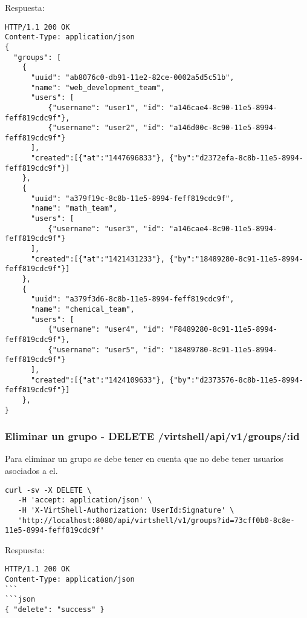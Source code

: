 \vspace{1cm}
Respuesta:
\vspace{1cm}

\begin{lstlisting}[style=json]
HTTP/1.1 200 OK
Content-Type: application/json
{
  "groups": [
    {
      "uuid": "ab8076c0-db91-11e2-82ce-0002a5d5c51b",
      "name": "web_development_team",
      "users": [ 
          {"username": "user1", "id": "a146cae4-8c90-11e5-8994-feff819cdc9f"},
          {"username": "user2", "id": "a146d00c-8c90-11e5-8994-feff819cdc9f"}
      ],     
      "created":[{"at":"1447696833"}, {"by":"d2372efa-8c8b-11e5-8994-feff819cdc9f"}]
    },
    {
      "uuid": "a379f19c-8c8b-11e5-8994-feff819cdc9f",
      "name": "math_team",
      "users": [ 
          {"username": "user3", "id": "a146cae4-8c90-11e5-8994-feff819cdc9f"}
      ],     
      "created":[{"at":"1421431233"}, {"by":"18489280-8c91-11e5-8994-feff819cdc9f"}]
    },
    {
      "uuid": "a379f3d6-8c8b-11e5-8994-feff819cdc9f",
      "name": "chemical_team",
      "users": [ 
          {"username": "user4", "id": "F8489280-8c91-11e5-8994-feff819cdc9f"},
          {"username": "user5", "id": "18489780-8c91-11e5-8994-feff819cdc9f"}
      ],       
      "created":[{"at":"1424109633"}, {"by":"d2373576-8c8b-11e5-8994-feff819cdc9f"}]
    },        
}  
\end{lstlisting}

\subsubsection{Eliminar un grupo - DELETE /virtshell/api/v1/groups/:id}

Para eliminar un grupo se debe tener en cuenta que no debe tener usuarios asociados a el.

\begin{lstlisting}[style=json]
curl -sv -X DELETE \
   -H 'accept: application/json' \
   -H 'X-VirtShell-Authorization: UserId:Signature' \
   'http://localhost:8080/api/virtshell/v1/groups?id=73cff0b0-8c8e-11e5-8994-feff819cdc9f'
\end{lstlisting}

\vspace{1cm}
Respuesta:
\vspace{1cm}

\begin{lstlisting}[style=json]
HTTP/1.1 200 OK
Content-Type: application/json
```
```json
{ "delete": "success" }
\end{lstlisting}
